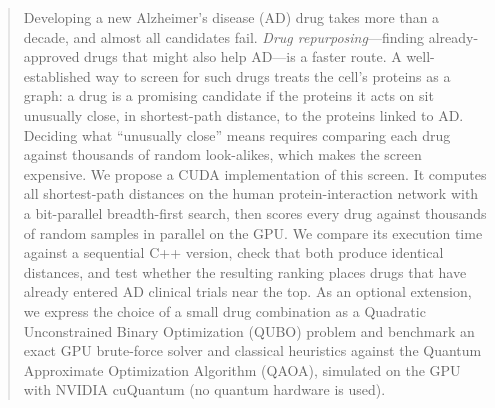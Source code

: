 \begin{abstract}
Developing a new Alzheimer's disease (AD) drug takes more than a decade, and almost all candidates fail. \emph{Drug repurposing}---finding already-approved drugs that might also help AD---is a faster route. A well-established way to screen for such drugs treats the cell's proteins as a graph: a drug is a promising candidate if the proteins it acts on sit unusually close, in shortest-path distance, to the proteins linked to AD. Deciding what ``unusually close'' means requires comparing each drug against thousands of random look-alikes, which makes the screen expensive. We propose a CUDA implementation of this screen. It computes all shortest-path distances on the human protein-interaction network with a bit-parallel breadth-first search, then scores every drug against thousands of random samples in parallel on the GPU. We compare its execution time against a sequential C++ version, check that both produce identical distances, and test whether the resulting ranking places drugs that have already entered AD clinical trials near the top. As an optional extension, we express the choice of a small drug combination as a Quadratic Unconstrained Binary Optimization (QUBO) problem and benchmark an exact GPU brute-force solver and classical heuristics against the Quantum Approximate Optimization Algorithm (QAOA), simulated on the GPU with NVIDIA cuQuantum (no quantum hardware is used).
\end{abstract}